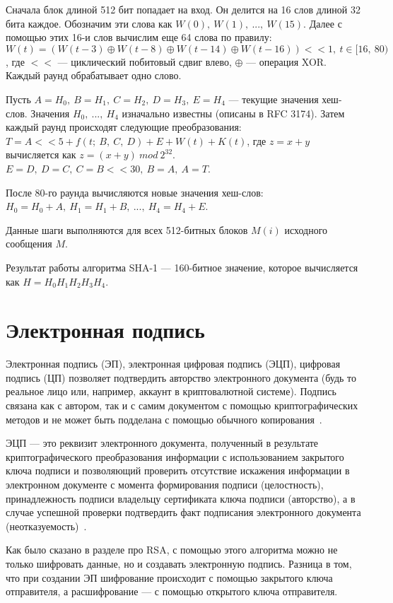 \documentclass{bmstu}
\begin{document}
Сначала блок длиной 512 бит попадает на вход. 
Он делится на 16 слов длиной 32 бита каждое. 
Обозначим эти слова как $W(0),~W(1),~...,~W(15)$. 
Далее с помощью этих 16-и слов вычислим еще 64 слова по правилу: $W(t) = (W(t - 3) \oplus W(t - 8) \oplus W(t - 14) \oplus W(t - 16)) << 1,~t \in [16,~80)$, где $<<$ --- циклический побитовый сдвиг влево, $\oplus$ --- операция XOR.
Каждый раунд обрабатывает одно слово.

Пусть $A = H_0,~B = H_1,~C = H_2,~D = H_3,~E = H_4$ --- текущие значения хеш-слов. 
Значения $H_0,~...,~H_4$ изначально известны (описаны в RFC 3174). 
Затем каждый раунд происходят следующие преобразования: $T = A << 5 + f(t;~B,~C,~D) + E + W(t) + K(t)$, где $z = x + y$ вычисляется как $z = (x + y)~mod~2^{32}$. 
$E = D,~D = C,~C = B << 30,~B = A,~A = T$.

После 80-го раунда вычисляются новые значения хеш-слов: $H_0 = H_0 + A,~H_1 = H_1 + B,~...,~H_4 = H_4 + E$.

Данные шаги выполняются для всех 512-битных блоков $M(i)$ исходного сообщения $M$.

Результат работы алгоритма SHA-1 --- 160-битное значение, которое вычисляется как $H = H_0H_1H_2H_3H_4$.

\chapter{Электронная подпись}

Электронная подпись (ЭП), электронная цифровая подпись (ЭЦП), цифровая подпись (ЦП) позволяет подтвердить авторство электронного документа (будь то реальное лицо или, например, аккаунт в криптовалютной системе). 
Подпись связана как с автором, так и с самим документом с помощью криптографических методов и не может быть подделана с помощью обычного копирования~\cite{wiki-ds}.

ЭЦП --- это реквизит электронного документа, полученный в результате криптографического преобразования информации с использованием закрытого ключа подписи и позволяющий проверить отсутствие искажения информации в электронном документе с момента формирования подписи (целостность), принадлежность подписи владельцу сертификата ключа подписи (авторство), а в случае успешной проверки подтвердить факт подписания электронного документа (неотказуемость)~\cite{wiki-ds}.

Как было сказано в разделе про RSA, с помощью этого алгоритма можно не только шифровать данные, но и создавать электронную подпись. 
Разница в том, что при создании ЭП шифрование происходит с помощью закрытого ключа отправителя, а расшифрование --- с помощью открытого ключа отправителя.
\end{document}
